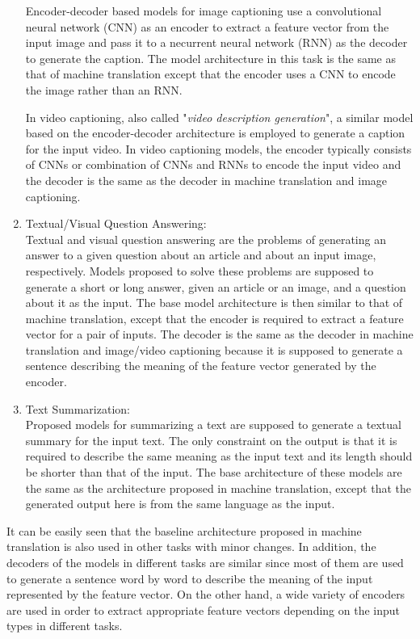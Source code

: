 \documentclass[preprint, 12pt]{elsarticle}
\begin{document}
\begin{enumerate}
		Encoder-decoder based models for image captioning use a convolutional neural network (CNN) as an encoder to extract a feature vector from the input image and pass it to a necurrent neural network (RNN) as the decoder to generate the caption. The model architecture in this task is the same as that of machine translation except that the encoder uses a CNN to encode the image rather than an RNN.
		
		In video captioning, also called "\textit{video description generation}", a similar model based on the encoder-decoder architecture is employed to generate a caption for the input video. In video captioning models, the encoder typically consists of CNNs or combination of CNNs and RNNs to encode the input video and the decoder is the same as the decoder in machine translation and image captioning. 
		
		
		\item Textual/Visual Question Answering:\\
		Textual and visual question answering are the problems of generating an answer to a given question about an article and about an input image, respectively. Models proposed to solve these problems are supposed to generate a short or long answer, given an article or an image, and a question about it as the input. The base model architecture is then similar to that of machine translation, except that the encoder is required to extract a feature vector for a pair of inputs. The decoder is the same as the decoder in machine translation and image/video captioning because it is supposed to generate a sentence describing the meaning of the feature vector generated by the encoder.
		
		\item Text Summarization:\\
		Proposed models for summarizing a text are supposed to generate a textual summary for the input text. The only constraint on the output is that it is required to describe the same meaning as the input text and its length should be shorter than that of the input. The base architecture of these models are the same as the architecture proposed in machine translation, except that the generated output here is from the same language as the input. 
		
	\end{enumerate}
	
	It can be easily seen that the baseline architecture proposed in machine translation is also used in other tasks with minor changes. In addition, the decoders of the models in different tasks are similar since most of them are used to generate a sentence word by word to describe the meaning of the input represented by the feature  vector. On the other hand, a wide variety of encoders are used in order to extract appropriate feature vectors depending on the input types in different tasks. 
	
\end{document}
